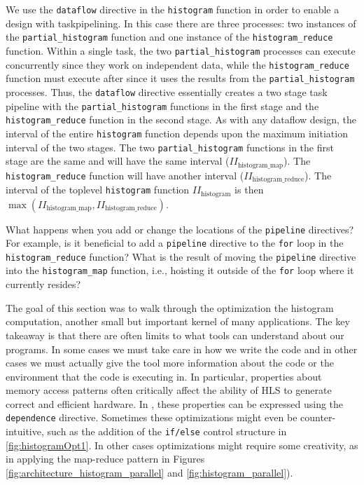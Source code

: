 We use the \lstinline{dataflow} directive in the \lstinline{histogram} function in order to enable a design with \gls{taskpipelining}.   In this case there are three processes: two instances of the \lstinline{partial_histogram} function and one instance of the \lstinline{histogram_reduce} function. Within a single task, the two \lstinline{partial_histogram} processes can execute concurrently since they work on independent data, while the \lstinline{histogram_reduce} function must execute after since it uses the results from the  \lstinline{partial_histogram} processes. Thus, the \lstinline{dataflow} directive essentially creates a two stage task pipeline with the \lstinline{partial_histogram} functions in the first stage and the \lstinline{histogram_reduce} function in the second stage.   As with any dataflow design, the interval of the entire \lstinline{histogram} function depends upon the maximum initiation interval of the two stages. The two \lstinline{partial_histogram} functions in the first stage are the same and will have the same interval ($II_\mathrm{histogram\_map}$). The \lstinline{histogram_reduce} function will have another interval ($II_\mathrm{histogram\_reduce}$). The interval of the toplevel \lstinline{histogram} function $II_\mathrm{histogram}$ is then $\max (II_\mathrm{histogram\_map}, II_\mathrm{histogram\_reduce})$.

\begin{exercise}
What happens when you add or change the locations of the \lstinline{pipeline} directives? For example, is it beneficial to add a \lstinline{pipeline} directive to the \lstinline{for} loop in the \lstinline{histogram_reduce} function? What is the result of moving the \lstinline{pipeline} directive into the \lstinline{histogram_map} function, i.e., hoisting it outside of the \lstinline{for} loop where it currently resides? 
\end{exercise}

The goal of this section was to walk through the optimization the histogram computation, another small but important kernel of many applications. The key takeaway is that there are often limits to what tools can understand about our programs.  In some cases we must take care in how we write the code and in other cases we must actually give the tool more information about the code or the environment that the code is executing in.  In particular, properties about memory access patterns often critically affect the ability of HLS to generate correct and efficient hardware.  In \VHLS, these properties can be expressed using the \lstinline|dependence| directive.  Sometimes these optimizations might even be counter-intuitive, such as the addition of the \lstinline{if/else} control structure in \ref{fig:histogramOpt1}.  In other cases optimizations might require some creativity, as in applying the map-reduce pattern in Figures \ref{fig:architecture_histogram_parallel} and \ref{fig:histogram_parallel}).  

